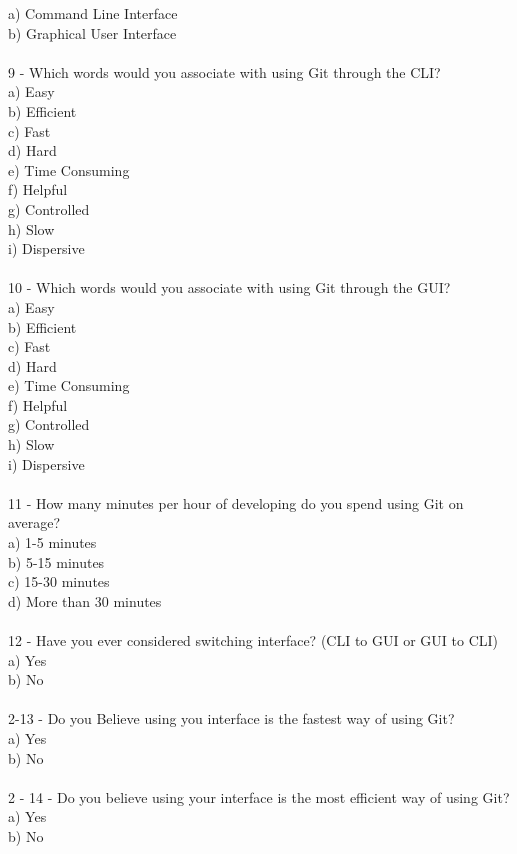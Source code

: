 \documentclass[]{report}
\begin{document}
	a) Command Line Interface\\
	b) Graphical User Interface\\\\
	9 - Which words would you associate with using Git through the CLI?\\
	a) Easy\\
	b) Efficient\\
	c) Fast\\
	d) Hard\\
	e) Time Consuming\\
	f) Helpful\\
	g) Controlled\\
	h) Slow\\
	i) Dispersive\\\\
	10 - Which words would you associate with using Git through the GUI?\\
	a) Easy\\
	b) Efficient\\
	c) Fast\\
	d) Hard\\
	e) Time Consuming\\
	f) Helpful\\
	g) Controlled\\
	h) Slow\\
	i) Dispersive\\\\
	11 - How many minutes per hour of developing do you spend using Git on average?\\
	a) 1-5 minutes\\
	b) 5-15 minutes\\
	c) 15-30 minutes\\
	d) More than 30 minutes\\\\
	12 - Have you ever considered switching interface? (CLI to GUI or GUI to CLI)\\
	a) Yes\\
	b) No\\\\
	2-13 - Do you Believe using you interface is the fastest way of using Git?\\
	a) Yes\\
	b) No\\\\
	2 - 14 - Do you believe using your interface is the most efficient way of using Git?\\
	a) Yes\\
	b) No\\\\
\end{document}
